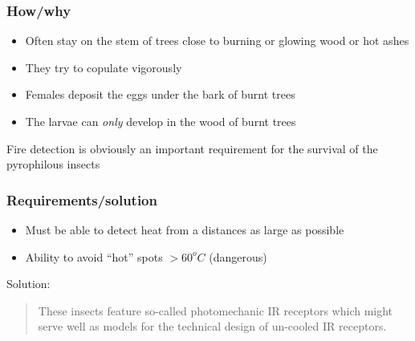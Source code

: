 \documentclass[14pt]{beamer}
\begin{document}
\begin{frame}
\frametitle{How/why}
\begin{itemize}
\item Often stay on the stem of trees close to burning or glowing wood or hot ashes
\item They try to copulate vigorously
\item Females deposit the eggs under the bark of burnt trees
\item The larvae can \emph{only} develop in the wood of burnt trees
\end{itemize}
Fire detection is obviously an important requirement for the survival of the pyrophilous insects
\end{frame}

\begin{frame}
\frametitle{Requirements/solution}
\begin{itemize}
\item Must be able to detect heat from a distances as large as possible
\item Ability to avoid ``hot'' spots $>60^oC$ (dangerous)
\end{itemize}
Solution:\\
\begin{quote}
\alert{These insects feature so-called photomechanic IR receptors} which might serve well as models for the technical design of un-cooled IR receptors.
\end{quote}
\end{frame}
\end{document}

